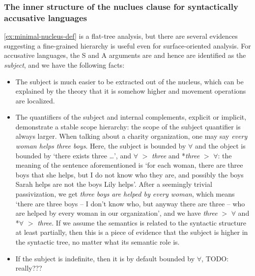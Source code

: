 \documentclass{article}
\newcommand*{\term}[1]{\emph{#1}}
\newcommand*{\corpus}[1]{\emph{#1}}
\begin{document}
\subsubsection{The inner structure of the nuclues clause for syntactically accusative languages}

\eqref{ex:minimal-nucleus-def} is a flat-tree analysis, 
but there are several evidences suggesting 
a fine-grained hierarchy is useful even for surface-oriented analysis.
For accusative languages, 
the S and A arguments are and hence are identified as the \term{subject}, 
and we have the following facts:
\begin{itemize}
    \item The subject is much easier to be extracted out of the nucleus,
    which can be explained by the theory that 
    it is somehow higher and movement operations are localized.
    \item The quantifiers of the subject and internal complements, 
    explicit or implicit, 
    demonstrate a stable scope hierarchy:
    the scope of the subject quantifier is always larger.
    When talking about a charity organization,
    one may say \corpus{every woman helps three boys}.
    Here, the subject is bounded by $\forall$ and the object is bounded by `there exists three \dots',
    and $\forall$ $>$ \corpus{three} and *\corpus{three} $>$ $\forall$:
    the meaning of the sentence aforementioned is 
    `for each woman, there are three boys that she helps,
    but I do not know who they are,
    and possibly the boys Sarah helps are not the boys Lily helps'.
    After a seemingly trivial passivization, 
    we get \corpus{three boys are helped by every woman},
    which means 
    `there are three boys -- I don't know who, but anyway there are three -- 
    who are helped by every woman in our organization',
    and we have \corpus{three} $>$ $\forall$ and *$\forall$ $>$ \corpus{three}.
    If we assume the semantics is related to the syntactic structure at least partially,
    then this is a piece of evidence that the subject is higher in the syntactic tree,
    no matter what its semantic role is. 
    \item If the subject is indefinite, then it is by default bounded by $\forall$, TODO: really???
    

\end{itemize}
\end{document}
